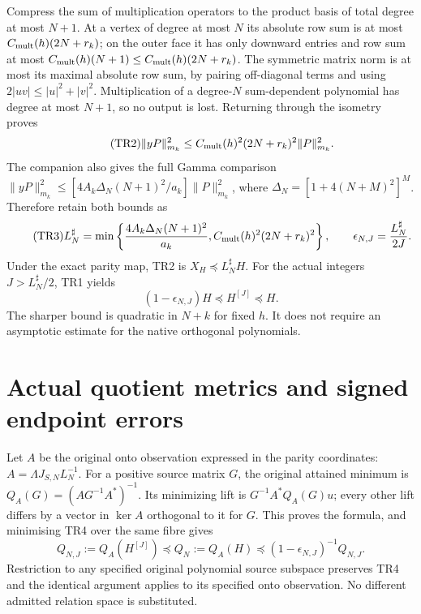 \documentclass[11pt]{article}
\begin{document}
Compress the sum of multiplication operators to the product basis
of total degree at most $N+1$. At a vertex of degree at most $N$
its absolute row sum is at most $C_{\rm mult}(h)(2N+r_k)$; on the
outer face it has only downward entries and row sum at most
$C_{\rm mult}(h)(N+1)\le C_{\rm mult}(h)(2N+r_k)$. The symmetric
matrix norm is at most its maximal absolute row sum, by pairing
off-diagonal terms and using $2|uv|\le |u|^2+|v|^2$. Multiplication
of a degree-$N$ sum-dependent polynomial has degree at most $N+1$,
so no output is lost. Returning through the isometry proves
\begin{equation}\tag{TR2}\label{eq:native}
 \|yP\|_{m_k}^2\le C_{\rm mult}(h)^2(2N+r_k)^2\|P\|_{m_k}^2.
\end{equation}
The companion also gives the full Gamma comparison
$\|yP\|_{m_k}^2\le[4A_k\Delta_N(N+1)^2/a_k]\|P\|_{m_k}^2$,
where $\Delta_N=[1+4(N+M)^2]^M$. Therefore retain both bounds as
\begin{equation}\tag{TR3}\label{eq:eps}
 L_N^\sharp=\min\left\{\frac{4A_k\Delta_N(N+1)^2}{a_k},
                     C_{\rm mult}(h)^2(2N+r_k)^2\right\},
 \qquad \epsilon_{N,J}=\frac{L_N^\sharp}{2J}.
\end{equation}
Under the exact parity map, TR2 is $X_H\preceq L_N^\sharp H$.
For the actual integers $J>L_N^\sharp/2$, TR1 yields
\begin{equation}\tag{TR4}\label{eq:relative}
 (1-\epsilon_{N,J})H\preceq H^{[J]}\preceq H.
\end{equation}
The sharper bound is quadratic in $N+k$ for fixed $h$. It does not
require an asymptotic estimate for the native orthogonal polynomials.

\section{Actual quotient metrics and signed endpoint errors}
Let $A$ be the original onto observation expressed in the parity
coordinates: $A=\Lambda J_{S,N}L_N^{-1}$. For a positive source
matrix $G$, the original attained minimum is
$Q_A(G)=(AG^{-1}A^*)^{-1}$. Its minimizing lift is
$G^{-1}A^*Q_A(G)u$; every other lift differs by a vector in $\ker A$
orthogonal to it for $G$. This proves the formula, and minimising
TR4 over the same fibre gives
\begin{equation}\tag{TR5}\label{eq:Q}
 Q_{N,J}:=Q_A(H^{[J]})\preceq Q_N:=Q_A(H)
           \preceq(1-\epsilon_{N,J})^{-1}Q_{N,J}.
\end{equation}
Restriction to any specified original polynomial source subspace
preserves TR4 and the identical argument applies to its specified
onto observation. No different admitted relation space is substituted.
\end{document}

